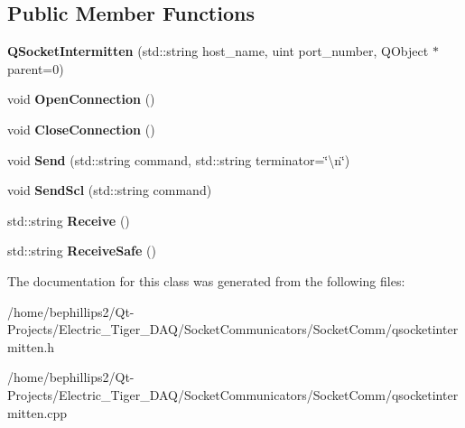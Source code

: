 \subsection*{Public Member Functions}
\begin{DoxyCompactItemize}
\item 
{\bfseries Q\+Socket\+Intermitten} (std\+::string host\+\_\+name, uint port\+\_\+number, Q\+Object $\ast$parent=0)\hypertarget{class_q_socket_intermitten_a10efaac40d71a525574fe238ebf0db74}{}\label{class_q_socket_intermitten_a10efaac40d71a525574fe238ebf0db74}

\item 
void {\bfseries Open\+Connection} ()\hypertarget{class_q_socket_intermitten_a01b636438109d46a2135f67dbb5446aa}{}\label{class_q_socket_intermitten_a01b636438109d46a2135f67dbb5446aa}

\item 
void {\bfseries Close\+Connection} ()\hypertarget{class_q_socket_intermitten_abecdd03c978b32edf1e464bb91ce5314}{}\label{class_q_socket_intermitten_abecdd03c978b32edf1e464bb91ce5314}

\item 
void {\bfseries Send} (std\+::string command, std\+::string terminator=\char`\"{}\textbackslash{}n\char`\"{})\hypertarget{class_q_socket_intermitten_a989c6bb818303c7a3119025d30c4aff6}{}\label{class_q_socket_intermitten_a989c6bb818303c7a3119025d30c4aff6}

\item 
void {\bfseries Send\+Scl} (std\+::string command)\hypertarget{class_q_socket_intermitten_a1c290c38ffec48bf30f93ad40bc82aaa}{}\label{class_q_socket_intermitten_a1c290c38ffec48bf30f93ad40bc82aaa}

\item 
std\+::string {\bfseries Receive} ()\hypertarget{class_q_socket_intermitten_a40414faabe73f8787499c27c34794aea}{}\label{class_q_socket_intermitten_a40414faabe73f8787499c27c34794aea}

\item 
std\+::string {\bfseries Receive\+Safe} ()\hypertarget{class_q_socket_intermitten_a05db0fd6ead8cd00f486d9e7f1a48caa}{}\label{class_q_socket_intermitten_a05db0fd6ead8cd00f486d9e7f1a48caa}

\end{DoxyCompactItemize}


The documentation for this class was generated from the following files\+:\begin{DoxyCompactItemize}
\item 
/home/bephillips2/\+Qt-\/\+Projects/\+Electric\+\_\+\+Tiger\+\_\+\+D\+A\+Q/\+Socket\+Communicators/\+Socket\+Comm/qsocketintermitten.\+h\item 
/home/bephillips2/\+Qt-\/\+Projects/\+Electric\+\_\+\+Tiger\+\_\+\+D\+A\+Q/\+Socket\+Communicators/\+Socket\+Comm/qsocketintermitten.\+cpp\end{DoxyCompactItemize}
